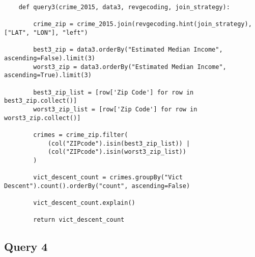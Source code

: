\documentclass{article}
\begin{document}
\begin{lstlisting}
    def query3(crime_2015, data3, revgecoding, join_strategy):

        crime_zip = crime_2015.join(revgecoding.hint(join_strategy), ["LAT", "LON"], "left")

        best3_zip = data3.orderBy("Estimated Median Income", ascending=False).limit(3)
        worst3_zip = data3.orderBy("Estimated Median Income", ascending=True).limit(3)

        best3_zip_list = [row['Zip Code'] for row in best3_zip.collect()]
        worst3_zip_list = [row['Zip Code'] for row in worst3_zip.collect()]

        crimes = crime_zip.filter(
            (col("ZIPcode").isin(best3_zip_list)) |
            (col("ZIPcode").isin(worst3_zip_list))
        )

        vict_descent_count = crimes.groupBy("Vict Descent").count().orderBy("count", ascending=False)

        vict_descent_count.explain()

        return vict_descent_count
\end{lstlisting}


\subsection*{Query 4}
\end{document}
